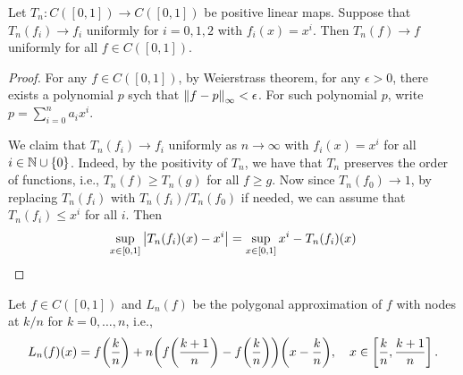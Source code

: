 \begin{theorem}[Korovkin]
    Let $T_n:C([0,1])\to C([0,1])$ be positive linear maps. Suppose that 
    $T_n(f_i)\to f_i$ uniformly for $i = 0,1,2$ with $f_i(x) = x^i$. Then 
    $T_n(f)\to f$ uniformly for all $f\in C([0,1])$.
\end{theorem}
\begin{proof}
    For any $f\in C([0,1])$, by Weierstrass theorem, for any $\epsilon>0$, 
    there exists a polynomial $p$ sych that $\left\lVert {f - p} \right\rVert_\infty<\epsilon$. 
    For such polynomial $p$, write $p = \sum_{i=0}^n a_ix^i$. 

    We claim that $T_n(f_i)\to f_i$ uniformly as $n\to\infty$ with $f_i(x) = x^i$ 
    for all $i\in\mathbb{N}\cup\left\{ {0} \right\}$. Indeed, by the positivity of $T_n$, we have that 
    $T_n$ preserves the order of functions, i.e., $T_n(f)\geq T_n(g)$ for all $f\geq g$. 
    Now since $T_n(f_0)\to 1$, by replacing $T_n(f_i)$ with $T_n(f_i)/T_n(f_0)$ if 
    needed, we can assume that $T_n(f_i)\leq x^i$ for all $i$. Then 
    \begin{equation*}
        \begin{split}
            \sup_{x\in[0,1]}\left\lvert {T_n(f_i)(x) - x^i} \right\rvert 
            &= \sup_{x\in[0,1]} x^i - T_n(f_i)(x) \\ 
        \end{split}
    \end{equation*}
\end{proof}

\begin{example}
    Let $f\in C([0,1])$ and $L_n(f)$ be the polygonal approximation of $f$ with 
    nodes at $k/n$ for $k = 0,\ldots,n$, i.e., 
    \begin{equation*}
        L_n(f)(x) = f\pth{\frac{k}{n}} + n\pth{f\pth{\frac{k+1}{n}} - f\pth{\frac{k}{n}}}\pth{x - \frac{k}{n}}, \quad x\in\sbrc{\frac{k}{n},\frac{k+1}{n}}.
    \end{equation*}
\end{example}